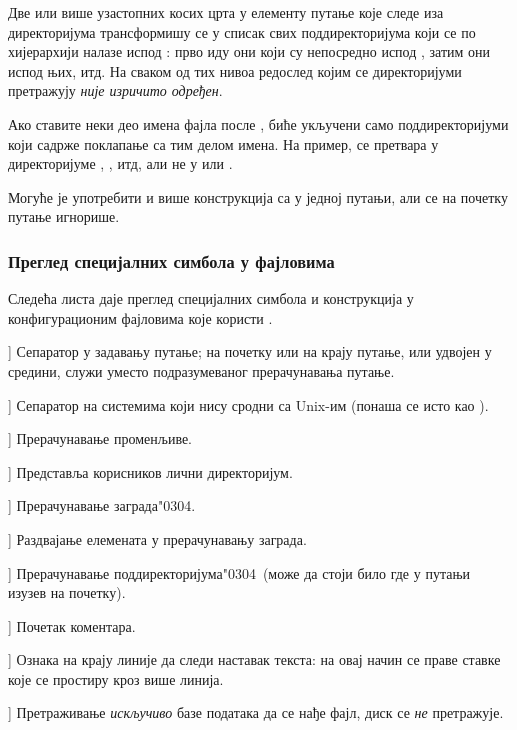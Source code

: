 \documentclass{article}
\begin{document}
Две или више узастопних косих црта у елементу путање које следе иза
директоријума  трансформишу се у списак свих поддиректоријума
који се по хијерархији налазе испод : прво иду они који су
непосредно испод , затим они испод њих, итд. На сваком од
тих нивоа редослед којим се директоријуми претражују \emph{није
изричито одређен}.

Ако ставите неки део имена фајла после \samp{//}, биће укључени само
поддиректоријуми који садрже поклапање са тим делом имена. На пример,
 се претвара у директоријуме ,
,  итд, али не у  или
.

Могуће је употребити и више конструкција са \samp{//} у једној
путањи, али се \samp{//} на почетку путање игнорише.

\subsubsection{Преглед специјалних симбола у фајловима }
\label{sec:cnf-special-chars}

Следећа листа даје преглед специјалних симбола и конструкција у 
конфигурационим фајловима које користи \KPS{}.

\newcommand{\CODE}[1]{\makebox[3em][l]{\code{#1}}}
\begin{ttdescription}
\item[\CODE{:}] Сепаратор у задавању путање; на почетку или на крају
  путање, или удвојен у средини, служи уместо подразумеваног 
  прерачунавања путање.
\item[\CODE{;}] Сепаратор на системима који нису сродни са Unix-им
  (понаша се исто као \code{:}).
\item[\CODE{\$}] Прерачунавање променљиве.
\item[\CODE{\string~}] Представља корисников лични директоријум.
\item[\CODE{\char`\{...\char`\}}] Прерачунавање заграда\char"0304.
\item[\CODE{,}] Раздвајање елемената у прерачунавању заграда.
\item[\CODE{//}] Прерачунавање поддиректоријума\char"0304\ (може да
  стоји било где у путањи изузев на почетку).
\item[\CODE{\%}] Почетак коментара.
\item[\CODE{\bs}] Ознака на крају линије да следи наставак текста:
  на овај начин се праве ставке које се простиру кроз више линија.
\item[\CODE{!!}] Претраживање \emph{искључиво} базе података да се
  нађе фајл, диск се \emph{не} претражује.
\end{ttdescription}
\end{document}
